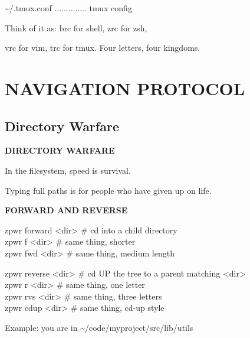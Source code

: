 \documentclass[11pt,a4paper,twoside]{book}
\begin{document}
\textasciitilde{}/.tmux.conf .............. tmux config

Think of it as: brc for shell, zrc for zsh,

\begin{codebox}
vrc for vim, trc for tmux. Four letters, four kingdoms.\\
\end{codebox}


\vspace{16pt}


\chapter{NAVIGATION PROTOCOL}

\section{Directory Warfare}


\vspace{10pt}
{\large\bfseries\color{neoncyan} DIRECTORY WARFARE}\vspace{6pt}

In the filesystem, speed is survival.

Typing full paths is for people who have given up on life.


\vspace{12pt}
{\bfseries\color{neonyellow} FORWARD AND REVERSE}\vspace{4pt}

\begin{codebox}
zpwr forward <dir>  \# cd into a child directory\\
zpwr f <dir>        \# same thing, shorter\\
zpwr fwd <dir>      \# same thing, medium length\\
\end{codebox}

\begin{codebox}
zpwr reverse <dir>  \# cd UP the tree to a parent matching <dir>\\
zpwr r <dir>        \# same thing, one letter\\
zpwr rvs <dir>      \# same thing, three letters\\
zpwr cdup <dir>     \# same thing, cd-up style\\
\end{codebox}

Example: you are in \textasciitilde{}/code/myproject/src/lib/utils
\end{document}

